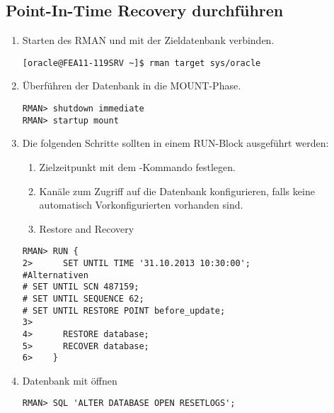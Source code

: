      \subsection{Point-In-Time Recovery durchf\"uhren}\label{dbpitrinc}
        \begin{enumerate}
          \item Starten des RMAN und mit der Zieldatenbank verbinden.
            \begin{lstlisting}[caption={Starten und Anmelden},label=admin1498,language=rman]
[oracle@FEA11-119SRV ~]$ rman target sys/oracle
            \end{lstlisting}
          \item \"Uberf\"uhren der Datenbank in die MOUNT-Phase.
            \begin{lstlisting}[caption={Shutdown und Mounten},label=admin1499,language=rman,alsolanguage=sqlplus]
RMAN> shutdown immediate
RMAN> startup mount
            \end{lstlisting}
          \item Die folgenden Schritte sollten in einem RUN-Block ausgef\"uhrt werden:
            \begin{enumerate}
              \item Zielzeitpunkt mit dem -Kommando festlegen.
              \item Kan\"ale zum Zugriff auf die Datenbank konfigurieren, falls keine automatisch Vorkonfigurierten vorhanden sind.
              \item Restore and Recovery
            \end{enumerate}
            \begin{lstlisting}[caption={Restore and Recovery},label=admin1500,language=rman]
RMAN> RUN {
2>      SET UNTIL TIME '31.10.2013 10:30:00';
#Alternativen
# SET UNTIL SCN 487159;
# SET UNTIL SEQUENCE 62;
# SET UNTIL RESTORE POINT before_update;
3>
4>      RESTORE database;
5>      RECOVER database;
6>    }
            \end{lstlisting}
          \item Datenbank mit  \"offnen
            \begin{lstlisting}[caption={Datenbank mit open resetlogs \"offnen},label=admin1501,language=rman,emph={[9]ALTER,DATABASE,OPEN,RESETLOGS},emphstyle={[9]\color{magenta}\bfseries}]
RMAN> SQL 'ALTER DATABASE OPEN RESETLOGS';
            \end{lstlisting}
        \end{enumerate}
